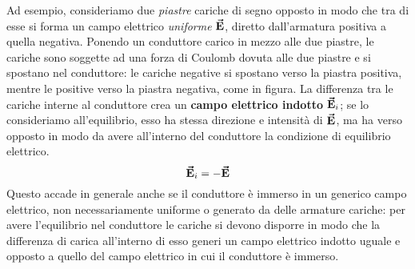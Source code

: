 Ad esempio, consideriamo due \textit{piastre} cariche di segno opposto in modo che tra di esse si forma un campo elettrico \textit{uniforme} $\vb*{\va{E}}$, diretto dall'armatura positiva a quella negativa.
Ponendo un conduttore carico in mezzo alle due piastre, le cariche sono soggette ad una forza di Coulomb dovuta alle due piastre e si spostano nel conduttore: le cariche negative si spostano verso la piastra positiva, mentre le positive verso la piastra negativa, come in figura.
La differenza tra le cariche interne al conduttore crea un \textbf{campo elettrico indotto} $\vb*{\va{E}}_i$; se lo consideriamo all'equilibrio, esso ha stessa direzione e intensità di $\vb*{\va{E}}$, ma ha verso opposto in modo da avere all'interno del conduttore la condizione di equilibrio elettrico.
\begin{equation}
	\vb*{\va{E}}_i=-\vb*{\va{E}}
\end{equation}
Questo accade in generale anche se il conduttore è immerso in un generico campo elettrico, non necessariamente uniforme o generato da delle armature cariche: per avere l'equilibrio nel conduttore le cariche si devono disporre in modo che la differenza di carica all'interno di esso generi un campo elettrico indotto uguale e opposto a quello del campo elettrico in cui il conduttore è immerso.
